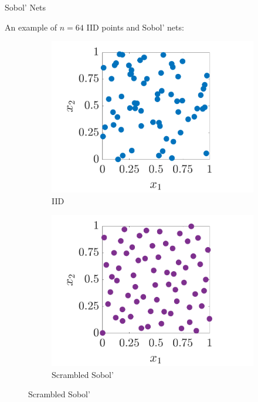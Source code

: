 \documentclass[handout, 10pt,compress,xcolor={usenames,dvipsnames}]{beamer} %
\begin{document}
\begin{frame}{Sobol' Nets}

An example of $n=64$ IID points and Sobol' nets:	

	\vspace{-3ex}
	\begin{figure}[htp]
		\centering
		\begin{subfigure}[b]{0.48\textwidth}
			\includegraphics[width=\textwidth]{../figures/IIDPoints}
			\caption{IID}
		\end{subfigure}
		\centering
		\begin{subfigure}[b]{0.48\textwidth}
			\includegraphics[width=\textwidth]{../figures/SSobolPoints}
			\caption{Scrambled Sobol'}
		\end{subfigure}
	\end{figure}
\end{frame}
\end{document}
